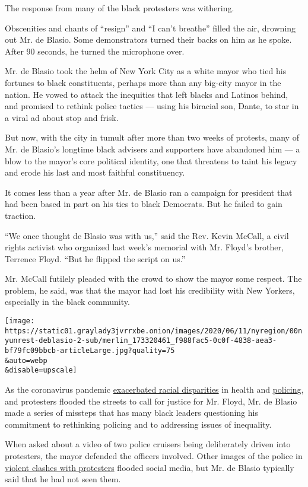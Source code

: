 The response from many of the black protesters was withering.

Obscenities and chants of ``resign'' and ``I can't breathe'' filled the
air, drowning out Mr. de Blasio. Some demonstrators turned their backs
on him as he spoke. After 90 seconds, he turned the microphone over.

Mr. de Blasio took the helm of New York City as a white mayor who tied
his fortunes to black constituents, perhaps more than any big-city mayor
in the nation. He vowed to attack the inequities that left blacks and
Latinos behind, and promised to rethink police tactics --- using his
biracial son, Dante, to star in a viral ad about stop and frisk.

But now, with the city in tumult after more than two weeks of protests,
many of Mr. de Blasio's longtime black advisers and supporters have
abandoned him --- a blow to the mayor's core political identity, one
that threatens to taint his legacy and erode his last and most faithful
constituency.

It comes less than a year after Mr. de Blasio ran a campaign for
president that had been based in part on his ties to black Democrats.
But he failed to gain traction.

``We once thought de Blasio was with us,'' said the Rev. Kevin McCall, a
civil rights activist who organized last week's memorial with Mr.
Floyd's brother, Terrence Floyd. ``But he flipped the script on us.''

Mr. McCall futilely pleaded with the crowd to show the mayor some
respect. The problem, he said, was that the mayor had lost his
credibility with New Yorkers, especially in the black community.

\texttt{[image: https://static01.graylady3jvrrxbe.onion/images/2020/06/11/nyregion/00nyunrest-deblasio-2-sub/merlin\_173320461\_f988fac5-0c0f-4838-aea3-bf79fc09bbcb-articleLarge.jpg?quality=75\\\&auto=webp\\\&disable=upscale]}

As the coronavirus pandemic
\href{https://www.nytimes3xbfgragh.onion/2020/04/08/nyregion/coronavirus-race-deaths.html}{exacerbated
racial disparities} in health and
\href{https://www.nytimes3xbfgragh.onion/2020/05/07/nyregion/nypd-social-distancing-race-coronavirus.html}{policing},
and protesters flooded the streets to call for justice for Mr. Floyd,
Mr. de Blasio made a series of missteps that has many black leaders
questioning his commitment to rethinking policing and to addressing
issues of inequality.

When asked about a video of two police cruisers being deliberately
driven into protesters, the mayor defended the officers involved. Other
images of the police in
\href{https://www.nytimes3xbfgragh.onion/2020/06/05/nyregion/police-kettling-protests-nyc.html}{violent
clashes with protesters} flooded social media, but Mr. de Blasio
typically said that he had not seen them.

